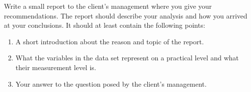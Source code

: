 Write a small report to the client's management where you give your recommendations. The report should describe your analysis and how you arrived at your conclusions. It should at least contain the following points: \\

\begin{enumerate}
    \item A short introduction about the reason and topic of the report.
    \item What the variables in the data set represent on a practical level and what their measurement level is. 
    
    \item Your answer to the question posed by the client's management.
\end{enumerate}

\clearpage %